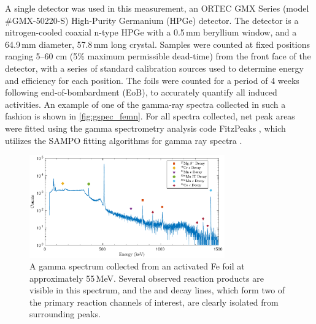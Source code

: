 A single detector was used in this measurement, an ORTEC GMX Series (model \#GMX-50220-S)  High-Purity Germanium (HPGe) detector.
The detector is a nitrogen-cooled coaxial n-type HPGe with a 0.5\,mm beryllium window, and a 64.9\,mm diameter, 57.8\,mm long crystal.
Samples were counted at fixed positions ranging 5--60  cm (5\% maximum permissible dead-time) from the front face of the detector, with a series of standard calibration sources used to determine energy and efficiency for each position.
The foils were counted  for a period of 4 weeks following end-of-bombardment (EoB), to accurately quantify all induced activities.
An example of one of the gamma-ray spectra collected in such a fashion is shown in \autoref{fig:gspec_femn}.
For all spectra collected, net peak areas were fitted using the gamma spectrometry analysis code FitzPeaks \cite{fitzgerald2009fitzpeaks}, which utilizes the SAMPO fitting algorithms for gamma ray spectra \cite{Aarnio2001}.

\begin{figure}
 \centering
 \includegraphics[width=0.75\textwidth]{./figures/sample_gspec_fe.pdf}
 \caption{A gamma spectrum collected from an activated Fe foil at approximately 55\,MeV. Several observed reaction products are visible in this spectrum, and  the  and  decay lines, which form two of the   primary reaction channels of interest, are  clearly isolated from surrounding peaks. }
 \label{fig:gspec_femn}
\end{figure}


